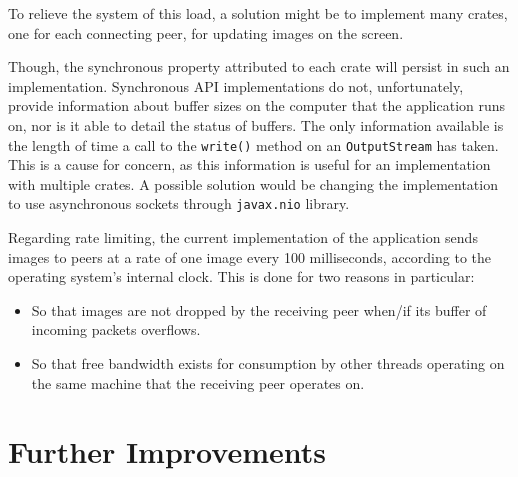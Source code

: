 \documentclass[10pt, a4paper]{article}
\begin{document}
To relieve the system of this load, a solution might be to implement many crates, one for each connecting peer, for updating images on the screen.

Though, the synchronous property attributed to each crate will persist in such an implementation.
Synchronous API implementations do not, unfortunately, provide information about buffer sizes on the computer that the application runs on, nor is it able to detail the status of buffers.
The only information available is the length of time a call to the \verb|write()| method on an \verb|OutputStream| has taken.
This is a cause for concern, as this information is useful for an implementation with multiple crates.
A possible solution would be changing the implementation to use asynchronous sockets through \verb|javax.nio| library.  

Regarding rate limiting, the current implementation of the application sends images to peers at a rate of one image every 100 milliseconds, according to the operating system's internal clock.
This is done for two reasons in particular:

\begin{itemize}
	\item So that images are not dropped by the receiving peer when/if its buffer of incoming packets overflows.
	\item So that free bandwidth exists for consumption by other threads operating on the same machine that the receiving peer operates on.
\end{itemize}

\section{Further Improvements}
\end{document}
